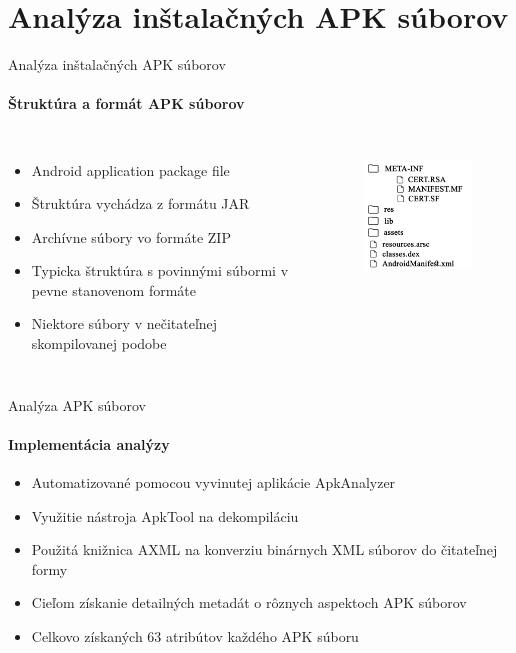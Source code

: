 \documentclass{beamer}
\begin{document}
\section{Analýza inštalačných APK súborov}
  \begin{frame}[label=lists]{Analýza inštalačných APK súborov}
   \framesubtitle{Štruktúra a formát APK súborov}
    \begin{columns}
       \begin{itemize}
		\item Android application package file	
		\item Štruktúra vychádza z formátu JAR
		\item Archívne súbory vo formáte ZIP
		\item Typicka štruktúra s povinnými súbormi v pevne stanovenom formáte
		\item Niektore súbory v nečitateľnej skompilovanej podobe
	\end{itemize}	  
        	 \begin{figure}[htb]
    \includegraphics[width=45mm]{images/apkStructure.pdf}
  \label{fig:strukturaApk}
\end{figure}
    \end{columns}
    
   \end{frame} 
    
  \begin{frame}[label=lists]{Analýza APK súborov}
  \framesubtitle{Implementácia analýzy}
	\begin{itemize}
		\item Automatizované pomocou vyvinutej aplikácie ApkAnalyzer\cite{apkanalyzer}
		\item Využitie nástroja ApkTool na dekompiláciu \cite{apktool}
		\item Použitá knižnica AXML na konverziu binárnych XML súborov do čitateľnej formy 
		\item Cieľom získanie detailných metadát o rôznych aspektoch APK súborov
		\item Celkovo získaných 63 atribútov každého APK súboru
	\end{itemize}	    
   \end{frame} 
   
\end{document}
